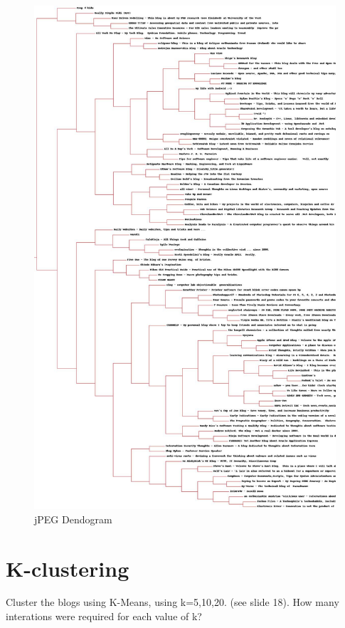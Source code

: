 \documentclass[paper=a4, fontsize=11pt]{scrartcl} %
\numberwithin{equation}{section} %
\numberwithin{figure}{section} %
\numberwithin{table}{section} %
\begin{document}
\begin{figure}[H]
\includegraphics[width=1\textwidth]{output/blogclust}
\caption{jPEG Dendogram}
\label{fig:jpeg}
\end{figure}

\section{K-clustering}
Cluster the blogs using K-Means, using k=5,10,20. (see slide 18).
How many interations were required for each value of k?
\end{document}
